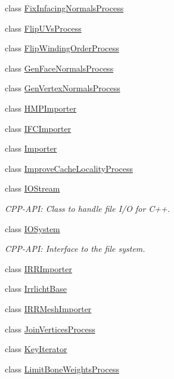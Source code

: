 \begin{DoxyCompactItemize}
\item 
class \hyperlink{class_assimp_1_1_fix_infacing_normals_process}{Fix\+Infacing\+Normals\+Process}
\item 
class \hyperlink{class_assimp_1_1_flip_u_vs_process}{Flip\+U\+Vs\+Process}
\item 
class \hyperlink{class_assimp_1_1_flip_winding_order_process}{Flip\+Winding\+Order\+Process}
\item 
class \hyperlink{class_assimp_1_1_gen_face_normals_process}{Gen\+Face\+Normals\+Process}
\item 
class \hyperlink{class_assimp_1_1_gen_vertex_normals_process}{Gen\+Vertex\+Normals\+Process}
\item 
class \hyperlink{class_assimp_1_1_h_m_p_importer}{H\+M\+P\+Importer}
\item 
class \hyperlink{class_assimp_1_1_i_f_c_importer}{I\+F\+C\+Importer}
\item 
class \hyperlink{class_assimp_1_1_importer}{Importer}
\item 
class \hyperlink{class_assimp_1_1_improve_cache_locality_process}{Improve\+Cache\+Locality\+Process}
\item 
class \hyperlink{class_assimp_1_1_i_o_stream}{I\+O\+Stream}
\begin{DoxyCompactList}\small\item\em C\+P\+P-\/\+A\+P\+I\+: Class to handle file I/\+O for C++. \end{DoxyCompactList}\item 
class \hyperlink{class_assimp_1_1_i_o_system}{I\+O\+System}
\begin{DoxyCompactList}\small\item\em C\+P\+P-\/\+A\+P\+I\+: Interface to the file system. \end{DoxyCompactList}\item 
class \hyperlink{class_assimp_1_1_i_r_r_importer}{I\+R\+R\+Importer}
\item 
class \hyperlink{class_assimp_1_1_irrlicht_base}{Irrlicht\+Base}
\item 
class \hyperlink{class_assimp_1_1_i_r_r_mesh_importer}{I\+R\+R\+Mesh\+Importer}
\item 
class \hyperlink{class_assimp_1_1_join_vertices_process}{Join\+Vertices\+Process}
\item 
class \hyperlink{class_assimp_1_1_key_iterator}{Key\+Iterator}
\item 
class \hyperlink{class_assimp_1_1_limit_bone_weights_process}{Limit\+Bone\+Weights\+Process}
\item 

\end{DoxyCompactItemize}
